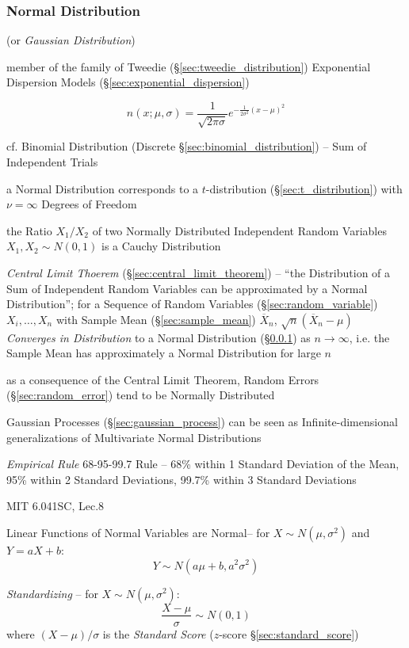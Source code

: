 \subsubsection{Normal Distribution}\label{sec:normal_distribution}

(or \emph{Gaussian Distribution})

member of the family of Tweedie (\S\ref{sec:tweedie_distribution}) Exponential
Dispersion Models (\S\ref{sec:exponential_dispersion})

\[
  n (x; \mu, \sigma) =
  \frac{1}{\sqrt{2\pi \sigma}} e^{-\frac{1}{2 \sigma^2}(x - \mu)^2}
\]

cf. Binomial Distribution (Discrete \S\ref{sec:binomial_distribution})
-- Sum of Independent Trials

a Normal Distribution corresponds to a $t$-distribution
(\S\ref{sec:t_distribution}) with $\nu = \infty$ Degrees of Freedom

the Ratio $X_1/X_2$ of two Normally Distributed Independent Random Variables
$X_1, X_2 \sim N(0,1)$ is a Cauchy Distribution

\emph{Central Limit Thoerem} (\S\ref{sec:central_limit_theorem}) -- ``the
Distribution of a Sum of Independent Random Variables can be approximated by a
Normal Distribution'';
for a Sequence of Random Variables (\S\ref{sec:random_variable})
$X_i, \ldots, X_n$ with Sample Mean (\S\ref{sec:sample_mean})
$\overline{X}_n$, $\sqrt{n}(\overline{X}_n - \mu)$
\emph{Converges in Distribution} to a Normal Distribution
(\S\ref{sec:normal_distribution}) as $n \rightarrow \infty$, i.e. the Sample
Mean has approximately a Normal Distribution for large $n$

as a consequence of the Central Limit Theorem, Random Errors
(\S\ref{sec:random_error}) tend to be Normally Distributed

\fist Gaussian Processes (\S\ref{sec:gaussian_process}) can be seen as
Infinite-dimensional generalizations of Multivariate Normal Distributions

\emph{Empirical Rule} 68-95-99.7 Rule -- 68\% within 1 Standard Deviation of the
Mean, 95\% within 2 Standard Deviations, 99.7\% within 3 Standard Deviations

MIT 6.041SC, Lec.8

Linear Functions of Normal Variables are Normal--
for $X \sim N(\mu, \sigma^2)$ and $Y = aX + b$:
\[
  Y \sim N(a \mu + b, a^2 \sigma^2)
\]

\emph{Standardizing} -- for $X \sim N(\mu, \sigma^2)$:
\[
  \frac{X - \mu}{\sigma} \sim N(0, 1)
\]
where $(X - \mu)/\sigma$ is the \emph{Standard Score}
($z$-score \S\ref{sec:standard_score})

